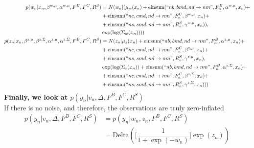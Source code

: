 \documentclass[a4paper]{article}
\begin{document}
\begin{align*}
    p(w_n|x_n, \beta^{w, \mu}, \alpha^{w,\mu}, F^B, F^C, R^S) &= N(w_n|(\mu_w(x_n) + \text{einsum}(``nb, bmd, nd \rightarrow nm",F^B_n, \alpha^{w, \mu}, x_n) + \\
                                                              & + \text{einsum}(``nc, cmd, nd \rightarrow nm",F^C_n, \beta^{w, \mu}, x_n) + \\
                                                              & + \text{einsum}(``ns, smd, nd \rightarrow nm",R^S_n, \gamma^{w, \mu}, x_n)), \\
                                                              & \exp(\log(\Sigma_w(x_n))))\\
    p(z_n|x_n, \beta^{z, \mu}, \beta^{z, \Sigma}, \alpha^{z,\mu}, \alpha^{z,\Sigma}, F^B, F^C, R^S) &= N(z_n|\mu_z(x_n) + \text{einsum}(``nb, bmd, nd \rightarrow nm",F^B_n, \alpha^{z, \mu}, x_n) + \\
                                                                                                                                   & + \text{einsum}(``nc, cmd, nd \rightarrow nm",F^C_n, \beta^{z, \mu}, x_n) + \\
                                                                                                                                   & + \text{einsum}(``ns, smd, nd \rightarrow nm",R^S_n, \gamma^{z, \mu}, x_n),\\
                                                                                                                                   & \exp(\log(\Sigma_z(x_n)) + \text{einsum}(``nb, bmd, nd \rightarrow nm",F^B_n, \alpha^{z, \Sigma}, x_n) + \\
                                                                                                                                   & + \text{einsum}(``nc, cmd, nd \rightarrow nm",F^C_n, \beta^{z, \Sigma}, x_n) + \\
                                                                                                                                   & + \text{einsum}(``ns, smd, nd \rightarrow nm",R^S_n, \gamma^{z, \Sigma}, x_n)))
\end{align*}
\textbf{Finally, we look at $p(y_n | v_n, \Delta, F^B, F^C, R^S)$}\\
If there is no noise, and therefore, the observations are truly zero-inflated
\begin{align*}
    p(y_n | v_n, \Delta, F^B, F^C, R^S) &= p(y_n | w_n, z_n, F^B, F^C, R^S)\\
                                        &= \text{Delta}(\lbrack \dfrac{1}{1+\exp(-w_n)} \rbrack \exp(z_n))
\end{align*}
\end{document}
